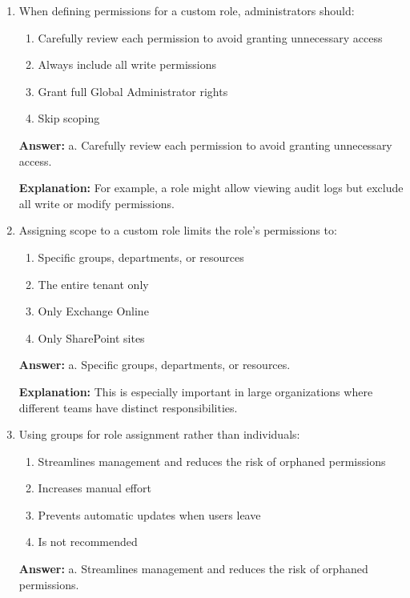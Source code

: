 \documentclass[10pt]{article}
\begin{document}
\begin{enumerate}[leftmargin=*]
\textbf{Explanation:} These steps support the principle of least privilege and help comply with regulatory requirements.

\item When defining permissions for a custom role, administrators should:
\begin{enumerate}[label=\alph*., leftmargin=1.5em]
\item Carefully review each permission to avoid granting unnecessary access
\item Always include all write permissions
\item Grant full Global Administrator rights
\item Skip scoping
\end{enumerate}
\textbf{Answer:} a. Carefully review each permission to avoid granting unnecessary access.

\textbf{Explanation:} For example, a role might allow viewing audit logs but exclude all write or modify permissions.

\item Assigning scope to a custom role limits the role’s permissions to:
\begin{enumerate}[label=\alph*., leftmargin=1.5em]
\item Specific groups, departments, or resources
\item The entire tenant only
\item Only Exchange Online
\item Only SharePoint sites
\end{enumerate}
\textbf{Answer:} a. Specific groups, departments, or resources.

\textbf{Explanation:} This is especially important in large organizations where different teams have distinct responsibilities.

\item Using groups for role assignment rather than individuals:
\begin{enumerate}[label=\alph*., leftmargin=1.5em]
\item Streamlines management and reduces the risk of orphaned permissions
\item Increases manual effort
\item Prevents automatic updates when users leave
\item Is not recommended
\end{enumerate}
\textbf{Answer:} a. Streamlines management and reduces the risk of orphaned permissions.


\end{enumerate}
\end{document}
